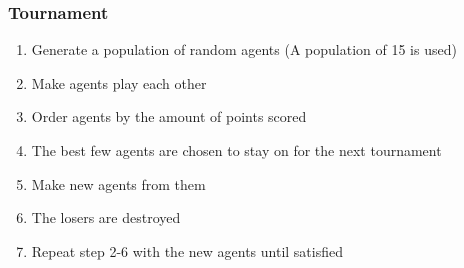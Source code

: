 \documentclass[aspectratio=169]{beamer}
\begin{document}
	\begin{frame}
		\frametitle{Tournament}
		\begin{enumerate}
			\item Generate a population of random agents (A population of 15 is used)
			\item Make agents play each other
			\item Order agents by the amount of points scored
			\item The best few agents are chosen to stay on for the next tournament
			\item Make new agents from them
			\item The losers are destroyed
			\item Repeat step 2-6 with the new agents until satisfied
		\end{enumerate}
	\end{frame}

\end{document}
